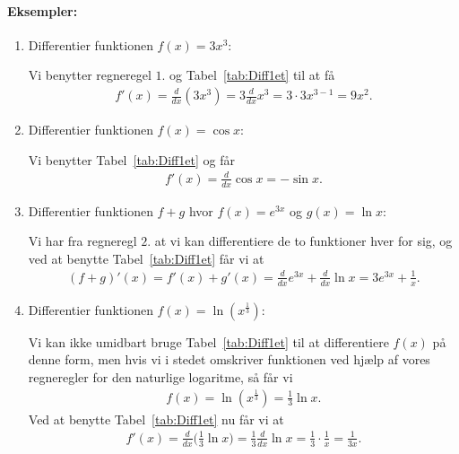 \paragraph*{Eksempler:}
\begin{enumerate}
\item Differentier funktionen $f(x)=3x^3$:

Vi benytter regneregel $1.$ og Tabel~\ref{tab:Diff1et} til at få
\begin{align*}
f'(x) = \frac{d}{dx} (3x^3) = 3 \frac{d}{dx} x^3 = 3 \cdot 3 x^{3-1} = 9x^2.
\end{align*}
\item Differentier funktionen $f(x)=\cos x$:

Vi benytter Tabel~\ref{tab:Diff1et} og får
\begin{align*}
f'(x) = \frac{d}{dx} \cos x = - \sin x.
\end{align*}
\item Differentier funktionen $f+g$ hvor $f(x)=e^{3x}$ og $g(x)= \ln x$:

Vi har fra regneregl $2.$ at vi kan differentiere de to funktioner hver for sig, og ved at benytte Tabel~\ref{tab:Diff1et} får vi at
\begin{align*}
(f+g)'(x) = f'(x) + g'(x) = \frac{d}{dx} e^{3x} + \frac{d}{dx}\ln x = 3e^{3x} + \frac{1}{x}.
\end{align*}
\item Differentier funktionen $f(x)=\ln(x^{\frac{1}{3}})$:

Vi kan ikke umidbart bruge Tabel~\ref{tab:Diff1et} til at differentiere $f(x)$ på denne form, men hvis vi i stedet omskriver funktionen ved hjælp af vores regneregler for den naturlige logaritme, så får vi
\begin{align*}
f(x) = \ln(x^{\frac{1}{3}}) = \frac{1}{3} \ln x.
\end{align*} 
Ved at benytte Tabel~\ref{tab:Diff1et} nu får vi at
\begin{align*}
f'(x) = \frac{d}{dx}\Big(\frac{1}{3} \ln x\Big)=\frac{1}{3} \frac{d}{dx}\ln x= \frac{1}{3} \cdot \frac{1}{x} = \frac{1}{3x}.
\end{align*}
\end{enumerate}
